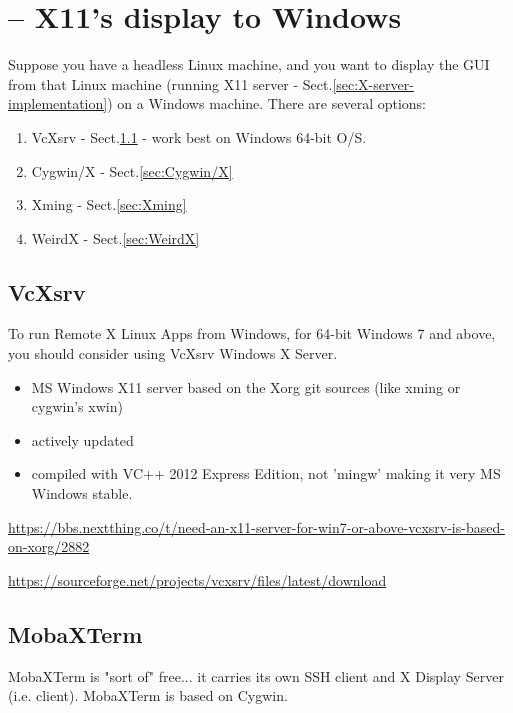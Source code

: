 


\section{-- X11's display to Windows}

Suppose you have a headless Linux machine, and you want to display the GUI from
that Linux machine (running X11 server -
Sect.\ref{sec:X-server-implementation}) on a Windows machine. There are several
options:

\begin{enumerate}
  \item VcXsrv - Sect.\ref{sec:VcXsrv} - work best on Windows 64-bit O/S.
  
  
  \item Cygwin/X - Sect.\ref{sec:Cygwin/X}
  \item Xming - Sect.\ref{sec:Xming}
  \item WeirdX - Sect.\ref{sec:WeirdX}
\end{enumerate}

\subsection{VcXsrv}
\label{sec:VcXsrv}

To run Remote X Linux Apps from Windows, for 64-bit Windows 7 and above, you
should consider using VcXsrv Windows X Server.
\begin{itemize}
  \item  MS Windows X11 server based on the Xorg git sources (like xming or
  cygwin's xwin)
  \item actively updated
  \item compiled with VC++ 2012 Express Edition, not 'mingw' making it very MS
  Windows stable.
  
\end{itemize}

\url{https://bbs.nextthing.co/t/need-an-x11-server-for-win7-or-above-vcxsrv-is-based-on-xorg/2882}

\url{https://sourceforge.net/projects/vcxsrv/files/latest/download}


\subsection{MobaXTerm}
\label{sec:MobaxTerm}

MobaXTerm is "sort of" free... it carries its own SSH client and X Display
Server (i.e. client). MobaXTerm is based on Cygwin.


